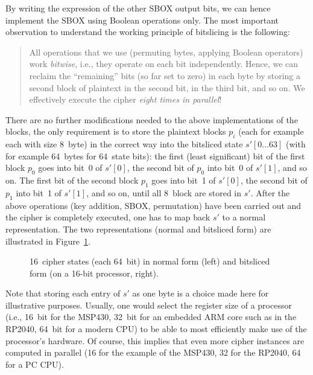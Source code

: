 By writing the expression of the other \ac{SBOX} output bits, we can hence implement the \ac{SBOX} using Boolean operations only.
The most important observation to understand the working principle of bitslicing is the following:

\begin{quote}
All operations that we use (permuting bytes, applying Boolean operators) work \emph{bitwise}, i.e., they operate on each bit independently. Hence, we can reclaim the ``remaining'' bits (so far set to zero) in each byte by storing a second block of plaintext in the second bit, in the third bit, and so on. We effectively execute the cipher \emph{eight times in parallel}!
\end{quote}

There are no further modifications needed to the above implementations of the blocks, the only requirement is to store the plaintext blocks $p_i$ (each for example each with size 8~byte) in the correct way into the bitsliced state $s'\left[0 ... 63\right]$ (with for example 64~bytes for 64~state bits): the first (least significant) bit of the first block $p_0$ goes into bit~0 of $s'\left[0\right]$, the second bit of $p_0$ into bit~0 of $s'\left[1\right]$, and so on. The first bit of the second block $p_1$ goes into bit~1 of $s'\left[0\right]$, the second bit of $p_1$ into bit~1 of $s'\left[1\right]$, and so on, until all 8~block are stored in $s'$. After the above operations (key addition, \ac{SBOX}, permutation) have been carried out and the cipher is completely executed, one has to map back $s'$ to a normal representation. The two representations (normal and bitsliced form) are illustrated in Figure~\ref{fig:symmetric_crypto:bitslicing}.

\begin{figure}[h!tb]
		\center
		
		\caption{16~cipher states (each 64~bit) in normal form (left) and bitsliced form (on a 16-bit processor, right).}
		\label{fig:symmetric_crypto:bitslicing}
\end{figure} 

Note that storing each entry of $s'$ as one byte is a choice made here for illustrative purposes. Usually, one would select the register size of a processor (i.e., 16~bit for the MSP430, 32~bit for an embedded ARM core such as in the RP2040, 64~bit for a modern \ac{CPU}) to be able to most efficiently make use of the processor's hardware. Of course, this implies that even more cipher instances are computed in parallel (16 for the example of the MSP430, 32 for the RP2040, 64 for a \ac{PC} \ac{CPU}).

